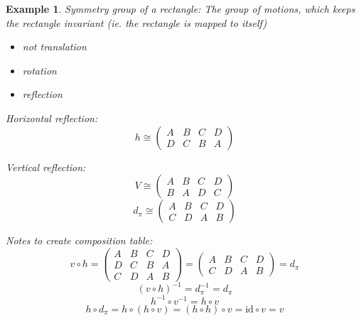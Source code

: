 \documentclass[a4paper,landscape,twocolumn]{article}
\newtheorem{ex}{Example}
\begin{document}
\begin{ex}
  \label{bsp-2-14}
  Symmetry group of a rectangle:
  The group of motions, which keeps the rectangle invariant
  (ie. the rectangle is mapped to itself)
  \begin{itemize}
    \item \emph{not} translation
    \item rotation
    \item reflection
  \end{itemize}

  Horizontal reflection:
  \[
    h \cong
    \begin{pmatrix}
      A & B & C & D \\
      D & C & B & A
    \end{pmatrix}
  \]

  Vertical reflection:
  \[
    V \cong
    \begin{pmatrix}
      A & B & C & D \\
      B & A & D & C
    \end{pmatrix}
  \]
  \[
    d_\pi \cong
    \begin{pmatrix}
      A & B & C & D \\
      C & D & A & B
    \end{pmatrix}
  \]

  Notes to create composition table:
  \[
    v \circ h =
    \begin{pmatrix}
      A & B & C & D \\
      D & C & B & A \\
      C & D & A & B
    \end{pmatrix}
    = \begin{pmatrix}
      A & B & C & D \\
      C & D & A & B
    \end{pmatrix}
    = d_\pi
  \]
  \[ (v \circ h)^{-1} = d_\pi^{-1} = d_\pi \]
  \[ h^{-1} \circ v^{-1} = h \circ v \]
  \[ h \circ d_\pi = h\circ (h\circ v) = (h \circ h) \circ v = \text{id} \circ v = v \]


\end{ex}
\end{document}
